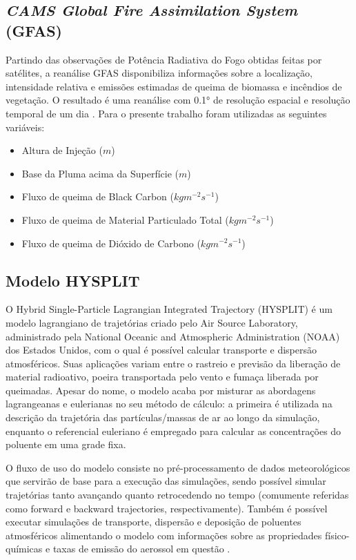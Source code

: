 \subsection{\textit{CAMS Global Fire Assimilation System} (GFAS)}
\label{subsec:cams-gfas}

	Partindo das observações de Potência Radiativa do Fogo obtidas feitas por satélites, a reanálise GFAS disponibiliza informações sobre a localização, intensidade relativa e emissões estimadas de queima de biomassa e incêndios de vegetação. O resultado é uma reanálise com 0.1° de resolução espacial e resolução temporal de um dia \autocite{kaiser2012}. Para o presente trabalho foram utilizadas as seguintes variáveis:
	\begin{itemize}
		\item Altura de Injeção ($m$)
		\item Base da Pluma acima da Superfície ($m$)
		\item Fluxo de queima de Black Carbon ($kgm^{-2}s^{-1}$)
		\item Fluxo de queima de Material Particulado Total ($kgm^{-2}s^{-1}$)
		\item Fluxo de queima de Dióxido de Carbono ($kgm^{-2}s^{-1}$)
	
	\end{itemize}
\subsection{Modelo HYSPLIT}
	O Hybrid Single-Particle Lagrangian Integrated Trajectory  (HYSPLIT) é um modelo lagrangiano de trajetórias criado pelo Air Source Laboratory, administrado pela National Oceanic and Atmospheric Administration (NOAA) dos Estados Unidos, com o qual é possível calcular transporte e dispersão atmosféricos. Suas aplicações variam entre o rastreio e previsão da liberação de material radioativo, poeira transportada pelo vento e fumaça liberada por queimadas. Apesar do nome, o modelo acaba por misturar as abordagens lagrangeanas e eulerianas no seu método de cálculo: a primeira é utilizada na descrição da trajetória das partículas/massas de ar ao longo da simulação, enquanto o referencial euleriano é empregado para calcular as concentrações do poluente em uma grade fixa.
	
	O fluxo de uso do modelo consiste no pré-processamento de dados meteorológicos que servirão de base para a execução das simulações, sendo possível simular trajetórias tanto avançando quanto retrocedendo no tempo (comumente referidas como forward e backward trajectories, respectivamente). Também é possível executar simulações de transporte, dispersão e deposição de poluentes atmosféricos alimentando o modelo com informações sobre as propriedades físico-químicas e taxas de emissão do aerossol em questão \autocite{stein2015}.
	
